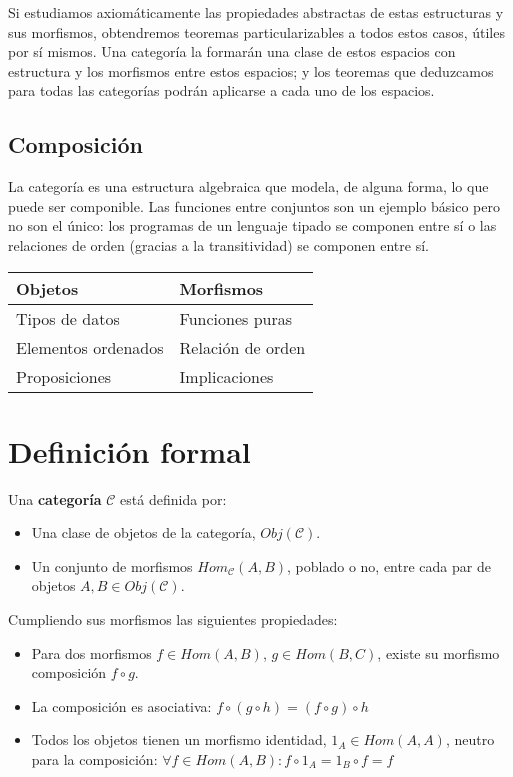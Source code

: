 \documentclass[11pt, fleqn, spanish]{book}
\newcommand{\C}{\mathcal{C} }
\begin{document}
Si estudiamos axiomáticamente las propiedades abstractas de estas estructuras y sus morfismos,
obtendremos teoremas particularizables a todos estos casos, útiles por sí mismos.
Una categoría la formarán una clase de estos espacios con estructura y los morfismos entre estos
espacios; y los teoremas que deduzcamos para todas las categorías podrán aplicarse a cada uno de
los espacios.

\subsection{Composición}
La categoría es una estructura algebraica que modela, de alguna forma,
lo que puede ser componible. Las funciones entre conjuntos son un ejemplo
básico pero no son el único: los programas de un lenguaje tipado se componen
entre sí o las relaciones de orden (gracias a la transitividad) se componen
entre sí.

\begin{center}
  \begin{tabular}{l|l}
    Objetos & Morfismos \\
    \hline
    Tipos de datos & Funciones puras \\
    Elementos ordenados & Relación de orden \\
    Proposiciones & Implicaciones
  \end{tabular}
\end{center}


\section {Definición formal}
\begin{definition}
  Una \textbf{categoría} $\C$ está definida por:
  
  \begin{itemize}
  \item Una clase de objetos de la categoría, $Obj(\mathcal{C})$.
  \item Un conjunto de morfismos $Hom_{\C}(A,B)$, poblado o no, entre
    cada par de objetos $A,B \in Obj(\C)$.
  \end{itemize}
  
\end{definition}

Cumpliendo sus morfismos las siguientes propiedades:

\begin{itemize}
\item Para dos morfismos $f \in Hom(A,B)$, $g \in Hom(B,C)$, existe su
  morfismo composición $f \circ g$.
\item La composición es asociativa: $f \circ (g \circ h) = (f \circ g) \circ h$
\item Todos los objetos tienen un morfismo identidad,
  $1_{A} \in Hom(A,A)$, neutro para la composición:
  $\forall f \in Hom(A,B): f \circ 1_{A} = 1_{B} \circ f = f$
\end{itemize}
\end{document}
